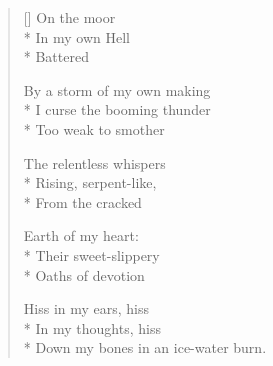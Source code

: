 \label{ch:lear_aw}
\settowidth{\versewidth}{Down my bones in an ice-water burn.}
\begin{verse}[\versewidth]
 On the moor\\*
In my own Hell\\*
Battered

By a storm of my own making\\*
I curse the booming thunder\\*
Too weak to smother

The relentless whispers\\*
Rising, serpent-like,\\*
From the cracked

Earth of my heart:\\*
Their sweet-slippery\\*
Oaths of devotion

Hiss in my ears, hiss\\*
In my thoughts, hiss\\*
Down my bones in an ice-water burn.
\end{verse}
